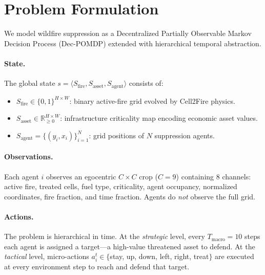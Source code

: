 \documentclass[letterpaper]{article}
\begin{document}
\section{Problem Formulation}
\label{sec:formulation}

We model wildfire suppression as a Decentralized Partially Observable Markov Decision Process (Dec-POMDP) extended with hierarchical temporal abstraction.

\paragraph{State.}
The global state $s = \langle S_{\text{fire}}, S_{\text{asset}}, S_{\text{agent}} \rangle$ consists of:
\begin{itemize}
    \item $S_{\text{fire}} \in \{0,1\}^{H \times W}$: binary active-fire grid evolved by Cell2Fire physics.
    \item $S_{\text{asset}} \in \mathbb{R}_{\geq 0}^{H \times W}$: infrastructure criticality map encoding economic asset values.
    \item $S_{\text{agent}} = \{(y_i, x_i)\}_{i=1}^N$: grid positions of $N$ suppression agents.
\end{itemize}

\paragraph{Observations.}
Each agent $i$ observes an egocentric $C \times C$ crop ($C = 9$) containing 8 channels: active fire, treated cells, fuel type, criticality, agent occupancy, normalized coordinates, fire fraction, and time fraction. Agents do \emph{not} observe the full grid.

\paragraph{Actions.}
The problem is hierarchical in time. At the \emph{strategic} level, every $T_{\text{macro}} = 10$ steps each agent is assigned a target---a high-value threatened asset to defend. At the \emph{tactical} level, micro-actions $a_i^t \in \{$stay, up, down, left, right, treat$\}$ are executed at every environment step to reach and defend that target.
\end{document}
